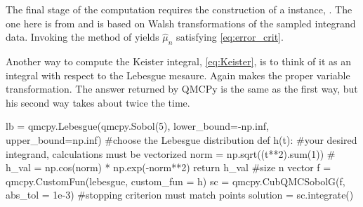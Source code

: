 \documentclass[11pt]{NSFamsart}
\newcommand{\hmu}{\hat{\mu}}
\begin{document}
The final stage of the computation requires the construction of a  instance, .  The one here is from \cite{HicJim16a} and is based on Walsh transformations of the sampled integrand data.  Invoking the  method of  yields $\hmu_n$ satisfying \eqref{eq:error_crit}.

Another way to compute the Keister integral, \eqref{eq:Keister}, is to think of it as an integral with respect to the Lebesgue mesaure.  Again  makes the proper variable transformation.  The answer returned by QMCPy is the same as the first way, but his second way takes about twice the time.

 \begin{pythoncode}
lb = qmcpy.Lebesgue(qmcpy.Sobol(5), lower_bound=-np.inf, upper_bound=np.inf)   #choose the Lebesgue distribution
def h(t):  #your desired integrand, calculations must be vectorized
 	norm = np.sqrt((t**2).sum(1))  #
 	h_val = np.cos(norm) * np.exp(-norm**2)
 	return h_val  #size n vector
 f = qmcpy.CustomFun(lebesgue, custom_fun = h)
 sc = qmcpy.CubQMCSobolG(f, abs_tol = 1e-3)  #stopping criterion must match  points
 solution = sc.integrate()
 \end{pythoncode}
 
\end{document}

